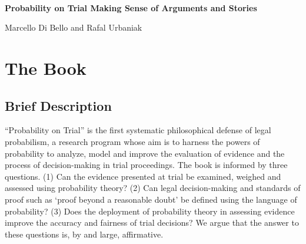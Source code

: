 \documentclass[
  10pt,
  dvipsnames,enabledeprecatedfontcommands]{scrartcl}
\author{}
\date{\vspace{-2.5em}}
\begin{document}
\begin{center}

$\, $

\vspace{-10mm}

\textbf{\huge  Probability on Trial \linebreak \normalsize  Making Sense of Arguments and Stories}
\vspace{2mm}

Marcello Di Bello and Rafal Urbaniak
\end{center}

\hypertarget{the-book}{%
\section{The Book}\label{the-book}}

\vspace{-2mm}

\hypertarget{brief-description}{%
\subsection{Brief Description}\label{brief-description}}

\normalsize

``Probability on Trial'' is the first systematic philosophical defense
of legal probabilism, a research program whose aim is to harness the
powers of probability to analyze, model and improve the evaluation of
evidence and the process of decision-making in trial proceedings. The
book is informed by three questions. (1) Can the evidence presented at
trial be examined, weighed and assessed using probability theory? (2)
Can legal decision-making and standards of proof such as `proof beyond a
reasonable doubt' be defined using the language of probability? (3) Does
the deployment of probability theory in assessing evidence improve the
accuracy and fairness of trial decisions? We argue that the answer to
these questions is, by and large, affirmative.
\end{document}
